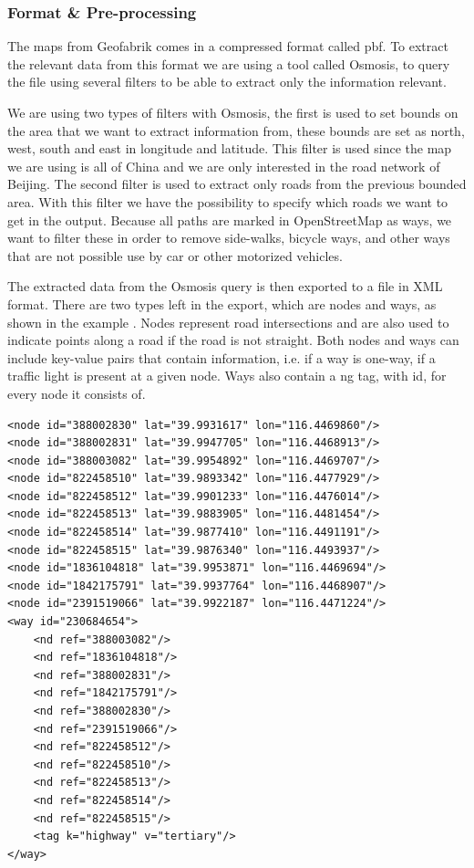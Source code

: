 \subsubsection{Format \& Pre-processing}
\label{chap:FormatPre-processing}
The maps from Geofabrik comes in a compressed format called pbf. To extract the relevant data from this format we are using a tool called Osmosis, to query the file using several filters to be able to extract only the information relevant.

We are using two types of filters with Osmosis, the first is used to set bounds on the area that we want to extract information from, these bounds are set as north, west, south and east in longitude and latitude. This filter is used since the map we are using is all of China and we are only interested in the road network of Beijing. The second filter is used to extract only roads from the previous bounded area. With this filter we have the possibility to specify which roads we want to get in the output. Because all paths are marked in OpenStreetMap as ways, we want to filter these in order to remove side-walks, bicycle ways, and other ways that are not possible use by car or other motorized vehicles.

The extracted data from the Osmosis query is then exported to a file in XML format. There are two types left in the export, which are nodes and ways, as shown in the example . Nodes represent road intersections and are also used to indicate points along a road if the road is not straight. Both nodes and ways can include key-value pairs that contain information, i.e. if a way is one-way, if a traffic light is present at a given node. Ways also contain a ng tag, with id, for every node it consists of.

\begin{lstlisting}[style=Java, caption=An example of a road and its related nodes in XML, label=wayexample]
<node id="388002830" lat="39.9931617" lon="116.4469860"/>
<node id="388002831" lat="39.9947705" lon="116.4468913"/>
<node id="388003082" lat="39.9954892" lon="116.4469707"/>
<node id="822458510" lat="39.9893342" lon="116.4477929"/>
<node id="822458512" lat="39.9901233" lon="116.4476014"/>
<node id="822458513" lat="39.9883905" lon="116.4481454"/>
<node id="822458514" lat="39.9877410" lon="116.4491191"/>
<node id="822458515" lat="39.9876340" lon="116.4493937"/>
<node id="1836104818" lat="39.9953871" lon="116.4469694"/>
<node id="1842175791" lat="39.9937764" lon="116.4468907"/>
<node id="2391519066" lat="39.9922187" lon="116.4471224"/>
<way id="230684654">
    <nd ref="388003082"/>
    <nd ref="1836104818"/>
    <nd ref="388002831"/>
    <nd ref="1842175791"/>
    <nd ref="388002830"/>
    <nd ref="2391519066"/>
    <nd ref="822458512"/>
    <nd ref="822458510"/>
    <nd ref="822458513"/>
    <nd ref="822458514"/>
    <nd ref="822458515"/>
    <tag k="highway" v="tertiary"/>
</way>
\end{lstlisting}

